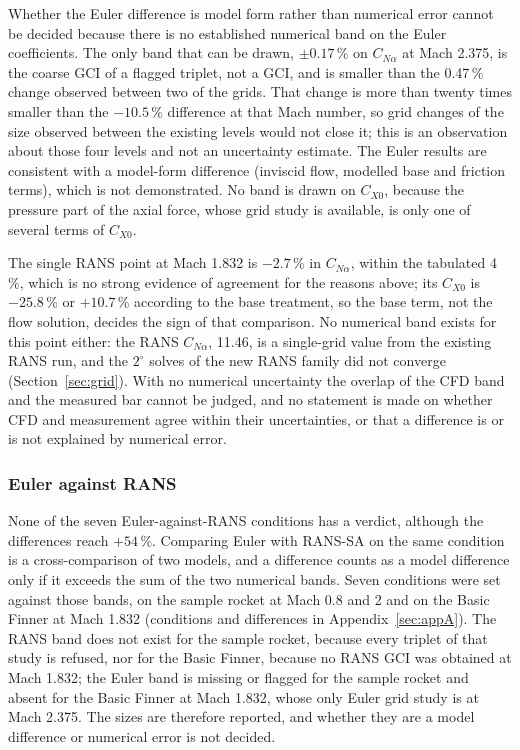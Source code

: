 \documentclass[twocolumn]{labreport}
\newcommand{\CNa}{C_{N\alpha}}
\newcommand{\CXzero}{C_{X0}}
\begin{document}
Whether the Euler difference is model form rather than numerical error cannot be decided because there is no established numerical band on the Euler coefficients.
The only band that can be drawn, $\pm0.17\,\%$ on $\CNa$ at Mach 2.375, is the coarse GCI of a flagged triplet, not a GCI, and is smaller than the 0.47\,\% change observed between two of the grids.
That change is more than twenty times smaller than the $-10.5\,\%$ difference at that Mach number, so grid changes of the size observed between the existing levels would not close it; this is an observation about those four levels and not an uncertainty estimate.
The Euler results are consistent with a model-form difference (inviscid flow, modelled base and friction terms), which is not demonstrated.
No band is drawn on $\CXzero$, because the pressure part of the axial force, whose grid study is available, is only one of several terms of $\CXzero$.

The single RANS point at Mach 1.832 is $-2.7\,\%$ in $\CNa$, within the tabulated 4\,\%, which is no strong evidence of agreement for the reasons above; its $\CXzero$ is $-25.8\,\%$ or $+10.7\,\%$ according to the base treatment, so the base term, not the flow solution, decides the sign of that comparison.
No numerical band exists for this point either: the RANS $\CNa$, 11.46, is a single-grid value from the existing RANS run, and the $2^\circ$ solves of the new RANS family did not converge (Section~\ref{sec:grid}).
With no numerical uncertainty the overlap of the CFD band and the measured bar cannot be judged, and no statement is made on whether CFD and measurement agree within their uncertainties, or that a difference is or is not explained by numerical error.

\subsubsection{Euler against RANS}
\label{sec:eulerrans}

None of the seven Euler-against-RANS conditions has a verdict, although the differences reach $+54\,\%$.
Comparing Euler with RANS-SA on the same condition is a cross-comparison of two models, and a difference counts as a model difference only if it exceeds the sum of the two numerical bands.
Seven conditions were set against those bands, on the sample rocket at Mach 0.8 and 2 and on the Basic Finner at Mach 1.832 (conditions and differences in Appendix~\ref{sec:appA}).
The RANS band does not exist for the sample rocket, because every triplet of that study is refused, nor for the Basic Finner, because no RANS GCI was obtained at Mach 1.832; the Euler band is missing or flagged for the sample rocket and absent for the Basic Finner at Mach 1.832, whose only Euler grid study is at Mach 2.375.
The sizes are therefore reported, and whether they are a model difference or numerical error is not decided.
\end{document}
